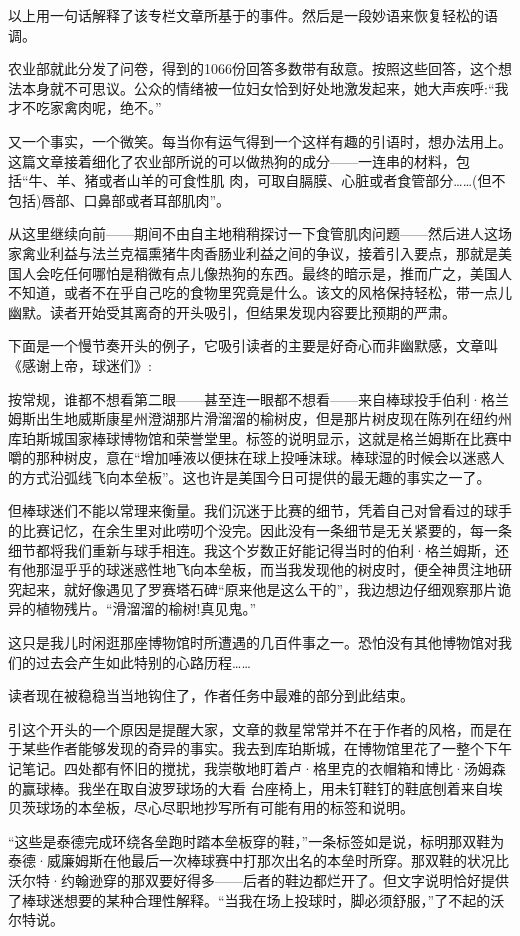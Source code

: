 以上用一句话解释了该专栏文章所基于的事件。然后是一段妙语来恢复轻松的语调。

农业部就此分发了问卷，得到的1066份回答多数带有敌意。按照这些回答，这个想法本身就不可思议。公众的情绪被一位妇女恰到好处地激发起来，她大声疾呼:“我才不吃家禽肉呢，绝不。”

又一个事实，一个微笑。每当你有运气得到一个这样有趣的引语时，想办法用上。这篇文章接着细化了农业部所说的可以做热狗的成分——一连串的材料，包括“牛、羊、猪或者山羊的可食性肌
肉，可取自膈膜、心脏或者食管部分……(但不包括)唇部、口鼻部或者耳部肌肉”。

从这里继续向前——期间不由自主地稍稍探讨一下食管肌肉问题——然后进人这场家禽业利益与法兰克福熏猪牛肉香肠业利益之间的争议，接着引入要点，那就是美国人会吃任何哪怕是稍微有点儿像热狗的东西。最终的暗示是，推而广之，美国人不知道，或者不在乎自己吃的食物里究竟是什么。该文的风格保持轻松，带一点儿幽默。读者开始受其离奇的开头吸引，但结果发现内容要比预期的严肃。

下面是一个慢节奏开头的例子，它吸引读者的主要是好奇心而非幽默感，文章叫《感谢上帝，球迷们》:

按常规，谁都不想看第二眼——甚至连一眼都不想看——来自棒球投手伯利·格兰姆斯出生地威斯康星州澄湖那片滑溜溜的榆树皮，但是那片树皮现在陈列在纽约州库珀斯城国家棒球博物馆和荣誉堂里。标签的说明显示，这就是格兰姆斯在比赛中嚼的那种树皮，意在“增加唾液以便抹在球上投唾沫球。棒球湿的时候会以迷惑人的方式沿弧线飞向本垒板”。这也许是美国今日可提供的最无趣的事实之一了。

但棒球迷们不能以常理来衡量。我们沉迷于比赛的细节，凭着自己对曾看过的球手的比赛记忆，在余生里对此唠叨个没完。因此没有一条细节是无关紧要的，每一条细节都将我们重新与球手相连。我这个岁数正好能记得当时的伯利·格兰姆斯，还有他那湿乎乎的球迷惑性地飞向本垒板，而当我发现他的树皮时，便全神贯注地研究起来，就好像遇见了罗赛塔石碑“原来他是这么干的”，我边想边仔细观察那片诡异的植物残片。“滑溜溜的榆树!真见鬼。”

这只是我儿时闲逛那座博物馆时所遭遇的几百件事之一。恐怕没有其他博物馆对我们的过去会产生如此特别的心路历程……

读者现在被稳稳当当地钩住了，作者任务中最难的部分到此结束。

引这个开头的一个原因是提醒大家，文章的救星常常并不在于作者的风格，而是在于某些作者能够发现的奇异的事实。我去到库珀斯城，在博物馆里花了一整个下午记笔记。四处都有怀旧的搅扰，我崇敬地盯着卢·格里克的衣帽箱和博比·汤姆森的赢球棒。我坐在取自波罗球场的大看 台座椅上，用未钉鞋钉的鞋底刨着来自埃贝茨球场的本垒板，尽心尽职地抄写所有可能有用的标签和说明。

“这些是泰德完成环绕各垒跑时踏本垒板穿的鞋，”一条标签如是说，标明那双鞋为泰德·威廉姆斯在他最后一次棒球赛中打那次出名的本垒时所穿。那双鞋的状况比沃尔特·约翰逊穿的那双要好得多——后者的鞋边都烂开了。但文字说明恰好提供了棒球迷想要的某种合理性解释。“当我在场上投球时，脚必须舒服，”了不起的沃尔特说。

